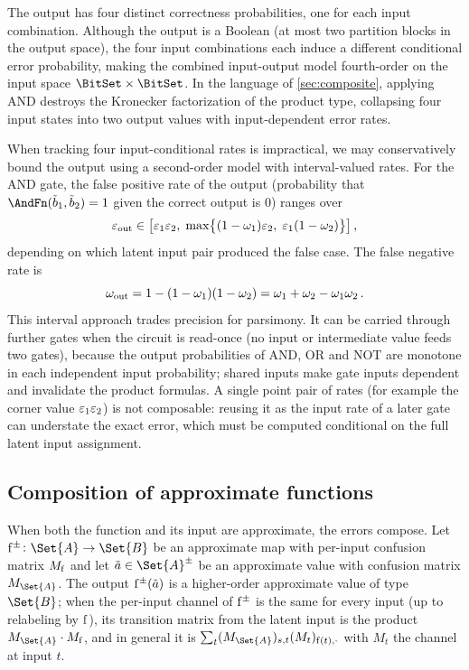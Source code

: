 \documentclass[ ../main.tex]{subfiles}
\begin{document}
The output has four distinct correctness probabilities, one for each input combination.
Although the output is a Boolean (at most two partition blocks in the output space), the four input combinations each induce a different conditional error probability, making the combined input-output model fourth-order on the input space $\BitSet \times \BitSet$.
In the language of \cref{sec:composite}, applying AND destroys the Kronecker factorization of the product type, collapsing four input states into two output values with input-dependent error rates.

\begin{remark}
When tracking four input-conditional rates is impractical, we may conservatively bound the output using a second-order model with interval-valued rates.
For the AND gate, the false positive rate of the output (probability that $\AndFn(\tilde{b}_1, \tilde{b}_2) = 1$ given the correct output is $0$) ranges over
\begin{equation}
\varepsilon_{\mathrm{out}} \in \bigl[\varepsilon_1 \varepsilon_2,\; \max\bigl\{(1 - \omega_1)\varepsilon_2,\; \varepsilon_1(1 - \omega_2)\bigr\}\bigr]\,,
\end{equation}
depending on which latent input pair produced the false case.
The false negative rate is
\begin{equation}
\omega_{\mathrm{out}} = 1 - (1 - \omega_1)(1 - \omega_2) = \omega_1 + \omega_2 - \omega_1 \omega_2\,.
\end{equation}
This interval approach trades precision for parsimony.
It can be carried through further gates when the circuit is read-once (no input or intermediate value feeds two gates), because the output probabilities of AND, OR and NOT are monotone in each independent input probability; shared inputs make gate inputs dependent and invalidate the product formulas.
A single point pair of rates (for example the corner value $\varepsilon_1\varepsilon_2$) is not composable: reusing it as the input rate of a later gate can understate the exact error, which must be computed conditional on the full latent input assignment.
\end{remark}

\subsection{Composition of approximate functions}

When both the function and its input are approximate, the errors compose.
Let $\APFun{f} \colon \Set{A} \to \Set{B}$ be an approximate map with per-input confusion matrix $M_{\Fun{f}}$ and let $\tilde{a} \in \AT{\Set{A}}$ be an approximate value with confusion matrix $M_{\Set{A}}$.
The output $\APFun{f}(\tilde{a})$ is a higher-order approximate value of type $\Set{B}$; when the per-input channel of $\APFun{f}$ is the same for every input (up to relabeling by $\Fun{f}$), its transition matrix from the latent input is the product $M_{\Set{A}} \cdot M_{\Fun{f}}$, and in general it is $\sum_{t} (M_{\Set{A}})_{s,t} (M_t)_{\Fun{f}(t), \cdot}$ with $M_t$ the channel at input $t$.
\end{document}
